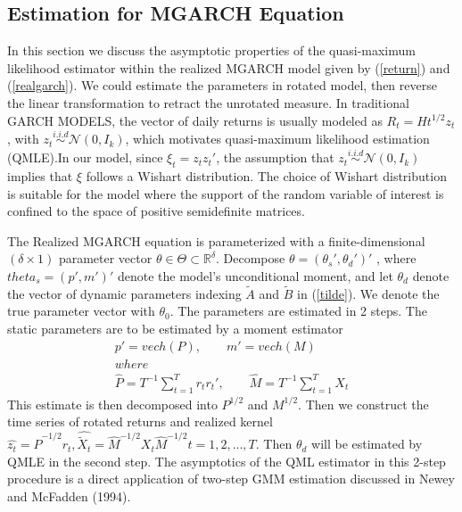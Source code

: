 \documentclass[titlepage,11pt]{article}
\begin{document}
\subsection{Estimation for MGARCH Equation}
In this section we discuss the asymptotic properties of the quasi-maximum likelihood estimator within the realized MGARCH model given by (\ref{return}) and (\ref{realgarch}). We could estimate the parameters in rotated model, then reverse the linear transformation to retract the unrotated measure.
 In traditional GARCH MODELS, the vector of daily returns is usually modeled as $R_t=Ht^{1/2} z_t$, with $z_t \overset{i.i.d} {\sim} \mathcal{N}(0,I_k)$, which motivates quasi-maximum likelihood estimation (QMLE).In our model, since $\xi_t = z_t z_t'$, the assumption that $z_t \overset{i.i.d} {\sim} \mathcal{N}(0,I_k)$ implies that $\xi$ follows a Wishart distribution. The choice of Wishart distribution is suitable for the model where the support of the random variable of interest is confined to the space of positive semidefinite matrices. 

The Realized MGARCH equation is parameterized with a finite-dimensional $(\delta \times 1)$ parameter vector $\theta\in \Theta\subset \mathbb{R}^\delta $. Decompose $\theta = (\theta_s',\theta_d')'$ , where $theta_s =(p', m')' $  denote the model's unconditional moment, and let $\theta_d$ denote the vector of dynamic parameters indexing $\tilde{A}$ and $\tilde{B}$ in (\ref{tilde}). We denote the true parameter vector with $\theta_0$. 
The parameters are estimated in 2 steps. The static parameters are to be estimated by a moment estimator
\begin{align*}
p' = vech (P) , \qquad m' = vech(M)\\   
where \\
\hat{P} = T^{-1} \sum_{t=1}^{T} r_t r_t' , \qquad 
\hat{M} = T^{-1} \sum_{t=1}^{T} X_t
\end{align*}
This estimate is then decomposed into $P^{1/2}$ and $M^{1/2}$. Then we construct the time series of rotated returns and realized kernel $\hat{z_t} = \hat{P}^{-1/2}r_t,\hat{\tilde{X}_t} = \hat{M}^{-1/2}X_t\hat{M}^{-1/2} t=1,2,...,T$. Then $\theta_d$ will be estimated by QMLE in the second step. The asymptotics of the QML estimator in this 2-step procedure is a direct application of two-step GMM estimation discussed in Newey and McFadden (1994).
\end{document}
